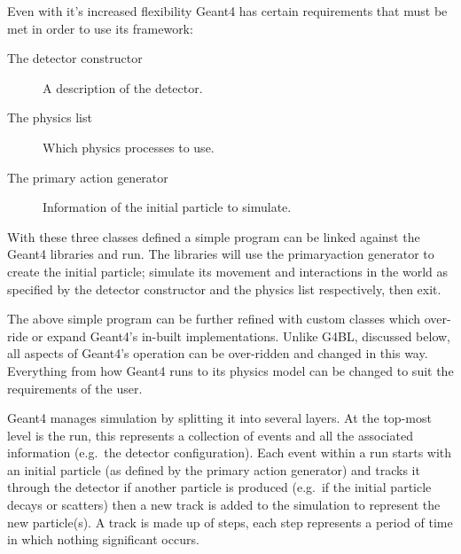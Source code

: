 Even with it's increased flexibility Geant4 has certain requirements that must be met in order to use its framework:
\begin{description}
  \item[The detector constructor] A description of the detector.
  \item[The physics list] Which physics processes to use.
  \item[The primary action generator] Information of the initial particle to simulate.
\end{description}
With these three classes defined a simple program can be linked against the Geant4 libraries and run. The libraries will use the primaryaction generator to create the initial particle; simulate its movement and interactions in the world as specified by the detector constructor and the physics list respectively, then exit.

The above simple program can be further refined with custom classes which over-ride or expand Geant4's in-built implementations. Unlike G4BL, discussed below, all aspects of Geant4's operation can be over-ridden and changed in this way. Everything from how Geant4 runs to its physics model can be changed to suit the requirements of the user.

Geant4 manages simulation by splitting it into several layers. At the top-most level is the run, this represents a collection of events and all the associated information (e.g.\ the detector configuration). Each event within a run starts with an initial particle (as defined by the primary action generator) and tracks it through the detector if another particle is produced (e.g.\ if the initial particle decays or scatters) then a new track is added to the simulation to represent the new particle(s). A track is made up of steps, each step represents a period of time in which nothing significant occurs.

